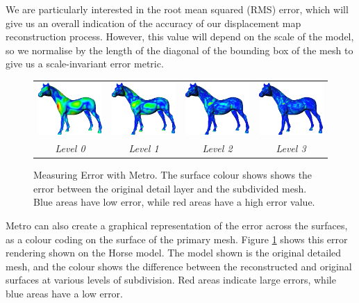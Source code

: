 We are particularly interested in the root mean squared (RMS) error, which will give us an overall indication of the accuracy of our displacement map reconstruction process. However, this value will depend on the scale of the model, so we normalise by the length of the diagonal of the bounding box of the mesh to give us a scale-invariant error metric.

\begin{figure}
\begin{center}
\begin{tabular}{cccc}
\includegraphics[width=3cm]{../images/horse_metro0} &
\includegraphics[width=3cm]{../images/horse_metro1} &
\includegraphics[width=3cm]{../images/horse_metro2} &
\includegraphics[width=3cm]{../images/horse_metro3} \\
{\it Level 0} & {\it Level 1} & {\it Level 2} & {\it Level 3}
\end{tabular}
\caption[Measuring Error with Metro]{\label{fig:measuremetro} Measuring Error with Metro. The surface colour shows shows the error between the original detail layer and the subdivided mesh. Blue areas have low error, while red areas have a high error value.}
\end{center}
\end{figure}

Metro can also create a graphical representation of the error across the surfaces, as a colour coding on the surface of the primary mesh. Figure \ref{fig:measuremetro} shows this error rendering shown on the Horse model. The model shown is the original detailed mesh, and the colour shows the difference between the reconstructed and original surfaces at various levels of subdivision. Red areas indicate large errors, while blue areas have a low error.

